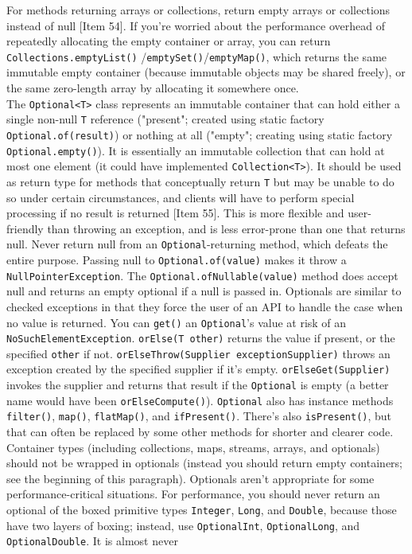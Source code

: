 \documentclass[table, xcdraw]{article}%
\begin{document}
For methods returning arrays or collections, return empty arrays or collections instead of null [Item 54]. If you're worried about the performance overhead of repeatedly allocating the empty container or array, you can return \texttt{Collections.emptyList()} /\texttt{emptySet()}/\texttt{emptyMap()}, which returns the same immutable empty container (because immutable objects may be shared freely), or the same zero-length array by allocating it somewhere once.\\
The \texttt{Optional<T>} class represents an immutable container that can hold either a single non-null \texttt{T} reference ("present"; created using static factory \texttt{Optional.of(result)}) or nothing at all ("empty"; creating using static factory \texttt{Optional.empty()}). It is essentially an immutable collection that can hold at most one element (it could have implemented \texttt{Collection<T>}). It should be used as return type for methods that conceptually return \texttt{T} but may be unable to do so under certain circumstances, and clients will have to perform special processing if no result is returned [Item 55]. This is more flexible and user-friendly than throwing an exception, and is less error-prone than one that returns null. Never return null from an \texttt{Optional}-returning method, which defeats the entire purpose. Passing null to \texttt{Optional.of(value)} makes it throw a \texttt{NullPointerException}. The \texttt{Optional.ofNullable(value)} method does accept null and returns an empty optional if a null is passed in. Optionals are similar to checked exceptions in that they force the user of an API to handle the case when no value is returned. You can \texttt{get()} an \texttt{Optional}'s value at risk of an \texttt{NoSuchElementException}. \texttt{orElse(T other)} returns the value if present, or the specified \texttt{other} if not. \texttt{orElseThrow(Supplier exceptionSupplier)} throws an exception created by the specified supplier if it's empty. \texttt{orElseGet(Supplier)} invokes the supplier and returns that result if the \texttt{Optional} is empty (a better name would have been \texttt{orElseCompute()}). \texttt{Optional} also has instance methods \texttt{filter()}, \texttt{map()}, \texttt{flatMap()}, and \texttt{ifPresent()}. There's also \texttt{isPresent()}, but that can often be replaced by some other methods for shorter and clearer code. Container types (including collections, maps, streams, arrays, and optionals) should not be wrapped in optionals (instead you should return empty containers; see the beginning of this paragraph). Optionals aren't appropriate for some performance-critical situations. For performance, you should never return an optional of the boxed primitive types \texttt{Integer}, \texttt{Long}, and \texttt{Double}, because those have two layers of boxing; instead, use \texttt{OptionalInt}, \texttt{OptionalLong}, and \texttt{OptionalDouble}. It is almost never 
\end{document}
